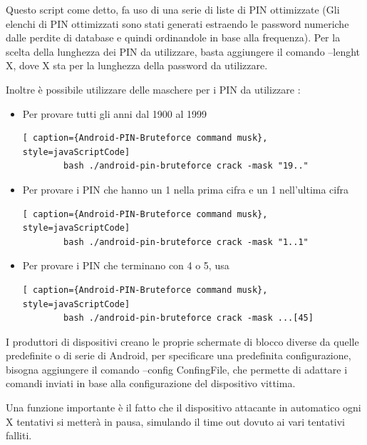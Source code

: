 Questo script come detto, fa uso di una serie di liste di PIN ottimizzate (Gli elenchi di PIN ottimizzati sono stati generati estraendo le password numeriche dalle perdite di database e quindi ordinandole in base alla frequenza). Per la scelta della lunghezza dei PIN da utilizzare, basta aggiungere il comando –lenght X, dove X sta per la lunghezza della password da utilizzare.

Inoltre è possibile utilizzare delle maschere per i PIN da utilizzare :
\begin{itemize}
	\item Per provare tutti gli anni dal 1900 al 1999 \newline
	\begin{lstlisting}[ caption={Android-PIN-Bruteforce command musk}, style=javaScriptCode]
		bash ./android-pin-bruteforce crack -mask "19.."
	\end{lstlisting}
	\item Per provare i PIN che hanno un 1 nella prima cifra e un 1 nell’ultima cifra \newline
	\begin{lstlisting}[ caption={Android-PIN-Bruteforce command musk}, style=javaScriptCode]
		bash ./android-pin-bruteforce crack -mask "1..1"
	\end{lstlisting}
	\item Per provare i PIN che terminano con 4 o 5, usa \newline
	\begin{lstlisting}[ caption={Android-PIN-Bruteforce command musk}, style=javaScriptCode]
		bash ./android-pin-bruteforce crack -mask ...[45]
	\end{lstlisting}
\end{itemize}

I produttori di dispositivi creano le proprie schermate di blocco diverse da quelle predefinite o di serie di Android, per specificare una predefinita configurazione, bisogna aggiungere il comando –config ConfingFile, che permette di adattare i comandi inviati in base alla configurazione del dispositivo vittima.

Una funzione importante è il fatto che il dispositivo attacante in automatico ogni X tentativi si metterà in pausa, simulando il time out dovuto ai vari tentativi falliti.

